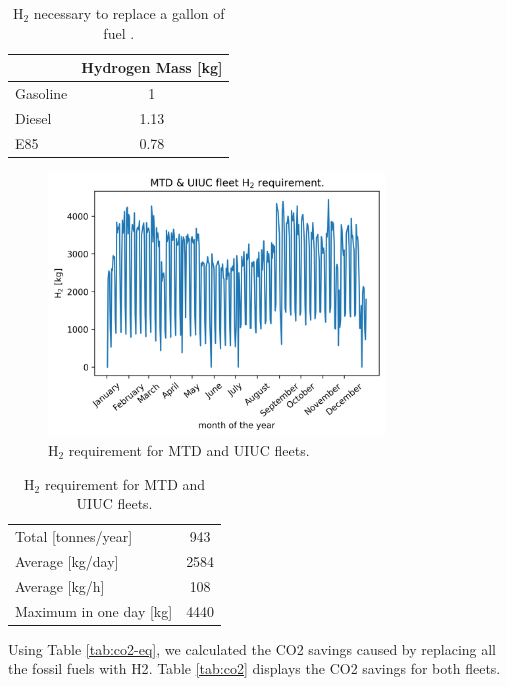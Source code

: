 	\begin{table}[htbp!]
	\centering
	\caption{H$_2$ necessary to replace a gallon of fuel \cite{doe_office_of_energy_efficiency_and_renewable_energy_hydrogen_2020} \cite{alternative_fuels_data_center_fuel_2014}.}
	\begin{tabular}{l|c}
	    \hline
	 	                 & Hydrogen Mass [kg] \\ \hline
	 	Gasoline         & 1                  \\
	 	Diesel           & 1.13               \\
	 	E85              & 0.78               \\ \hline
	\end{tabular}
	\label{tab:equiv}
	\end{table}

	\begin{figure}[htbp!]
	    \centering
		\includegraphics[height=7.0cm]{figures-hydro/hydro-fleet}
		\hfill
		\caption{H$_2$ requirement for MTD and UIUC fleets.}
		\label{fig:hydro-fleet}
	\end{figure}

	\begin{table}[htbp!]
		\centering
	    \caption{H$_2$ requirement for MTD and UIUC fleets.}
		\begin{tabular}{l|c}
		\hline
		Total [tonnes/year]     & 943    \\
		Average [kg/day] 	    & 2584   \\
		Average [kg/h] 		    & 108    \\
		Maximum in one day [kg] & 4440   \\ \hline
        \end{tabular}
        \label{tab:hydro-fleet}
	\end{table}

Using Table \ref{tab:co2-eq}, we calculated the \gls{CO2} savings caused by replacing all the fossil fuels with \gls{H2}.
Table \ref{tab:co2} displays the \gls{CO2} savings for both fleets.

